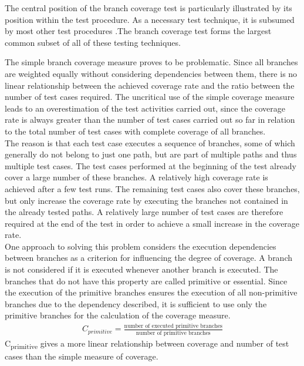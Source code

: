 
The central position of the branch coverage test is particularly illustrated by its position within the test procedure. As a necessary test technique, it is subsumed by most other test procedures .The branch coverage test forms the largest common subset of all of these testing techniques. 
	

	The simple branch coverage measure proves to be problematic. Since all branches are weighted equally without considering dependencies between them, there is no linear relationship between the achieved coverage rate and the ratio between the number of test cases required. The uncritical use of the simple coverage measure leads to an overestimation of the test activities carried out, since the coverage rate is always greater than the number of test cases carried out so far in relation to the total number of test cases with complete coverage of all branches. \\

	The reason is that each test case executes a sequence of branches, some of which generally do not belong to just one path, but are part of multiple paths and thus multiple test cases. The test cases performed at the beginning of the test already cover a large number of these branches. A relatively high coverage rate is achieved after a few test runs. The remaining test cases also cover these branches, but only increase the coverage rate by executing the branches not contained in the already tested paths. A relatively large number of test cases are therefore required at the end of the test in order to achieve a small increase in the coverage rate. \\

	One approach to solving this problem considers the execution dependencies between branches as a criterion for influencing the degree of coverage. A branch is not considered if it is executed whenever another branch is executed. The branches that do not have this property are called primitive or essential. Since the execution of the primitive branches ensures the execution of all non-primitive branches due to the dependency described, it is sufficient to use only the primitive branches for the calculation of the coverage measure.
	\begin{align*}
		C_{primitive} = \frac{\textrm{number of executed primitive branches}}{\textrm{number of primitive branches}}
	\end{align*}
	C\textsubscript{primitive} gives a more linear relationship between coverage and number of test cases than the simple measure of coverage. 

